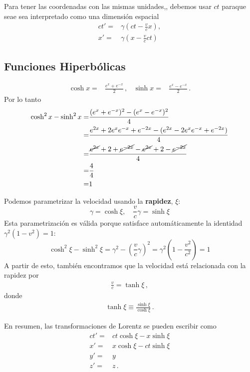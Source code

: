 \documentclass[11pt,a4paper]{article}
\begin{document}
Para tener las coordenadas con las mismas unidades,, debemos usar $ct$ paraque seae sea interpretado como una dimensión espacial
\begin{align}
ct' =& \gamma\left(ct-\frac{v}{c}x\right),\\
x'=&\gamma\left(x-\frac{v}{c}ct\right)
\end{align}


\subsection{Funciones Hiperbólicas}
\begin{align*}
    \cosh x =& \frac{{e}^{x}+{e}^{-x}}{2}\,,&
\sinh x =& \frac{{e}^{x}-{e}^{-x}}{2}\,.
\end{align*}
Por lo tanto
\begin{align*}
    \cosh^2x - \sinh^2x =& \frac{({e}^{x}+{e}^{-x})^2
    -({e}^{x}-{e}^{-x})^2}{4}\\
    =&\frac{{e}^{2x}+2{e}^{x}{e}^{-x}+{e}^{-2x}
-({e}^{2x}-2{e}^{x}{e}^{-x}+{e}^{-2x})}{4}\\
=&\frac{\cancel{{e}^{2x}}+2+\cancel{{e}^{-2x}}
-\cancel{{e}^{2x}}+2-\cancel{{e}^{-2x}}}{4}\\
=&\frac{4}{4}\\
=&1
\end{align*}

Podemos parametrizar la velocidad usando la \textbf{rapidez}, $\xi$:
\[ \gamma = \cosh\xi, \quad \frac{v}{c}\gamma = \sinh\xi \]
Esta parametrización es válida porque satisface automáticamente la identidad $\gamma^2(1-v^2)=1$:
\[ \cosh^2\xi - \sinh^2\xi = \gamma^2 - \left(\frac{v}{c}\gamma\right)^2 = \gamma^2\left(1-\frac{v^2}{c^2}\right) = 1 \]
A partir de esto, también encontramos que la velocidad está relacionada con la rapidez por 
\begin{align*}
    \frac{v}{c} = \tanh\xi\,,
\end{align*}
donde
\begin{align*}
\tanh\xi \equiv \frac{\sinh\xi}{\cosh\xi}\,.    
\end{align*}

En resumen, las transformaciones de Lorentz se pueden escribir como
\[
\boxed{
\begin{aligned}    
    ct' =& ct\cosh\xi - x\sinh\xi \\
    x' = &x\cosh\xi -ct\sinh\xi\\
    y' = & y\\
    z' = &z\,.
\end{aligned}
}
\]
\end{document}
